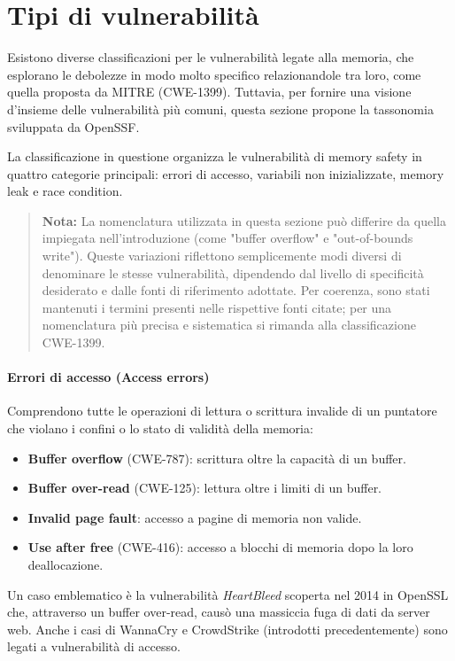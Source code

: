 \section{Tipi di vulnerabilità}
\label{sec:vulnerability_types}

Esistono diverse classificazioni per le vulnerabilità legate alla memoria, che
esplorano le debolezze in modo molto specifico relazionandole tra loro, come quella
proposta da MITRE (CWE-1399\cite{cwe_1399}). Tuttavia, per fornire una visione d'insieme
delle vulnerabilità più comuni, questa sezione propone la tassonomia sviluppata da
OpenSSF\cite{memory_safety_continuum_definition}.

La classificazione in questione organizza le vulnerabilità di memory safety in
quattro categorie principali: errori di accesso, variabili non inizializzate, memory
leak e race condition.

\begin{quote}
  \textbf{Nota:} La nomenclatura utilizzata in questa sezione può differire da
  quella impiegata nell'introduzione (come "buffer overflow" e "out-of-bounds
  write"). Queste variazioni riflettono semplicemente modi diversi di denominare
  le stesse vulnerabilità, dipendendo dal livello di specificità desiderato e
  dalle fonti di riferimento adottate. Per coerenza, sono stati mantenuti i
  termini presenti nelle rispettive fonti citate; per una nomenclatura più precisa
  e sistematica si rimanda alla classificazione CWE-1399\cite{cwe_1399}.
\end{quote}

\paragraph{Errori di accesso (Access errors)}
\label{sec:access_errors}

Comprendono tutte le operazioni di lettura o scrittura invalide di un puntatore
che violano i confini o lo stato di validità della memoria:
\begin{itemize}
  \item \textbf{Buffer overflow} (CWE-787): scrittura oltre la capacità di un buffer.

  \item \textbf{Buffer over-read} (CWE-125): lettura oltre i limiti di un buffer.

  \item \textbf{Invalid page fault}: accesso a pagine di memoria non valide.

  \item \textbf{Use after free} (CWE-416): accesso a blocchi di memoria dopo la loro
    deallocazione.
\end{itemize}
Un caso emblematico è la vulnerabilità \textit{HeartBleed}\cite{heartbleed} scoperta
nel 2014 in OpenSSL che, attraverso un buffer over-read, causò una massiccia fuga
di dati da server web. Anche i casi di WannaCry e CrowdStrike (introdotti precedentemente)
sono legati a vulnerabilità di accesso.

